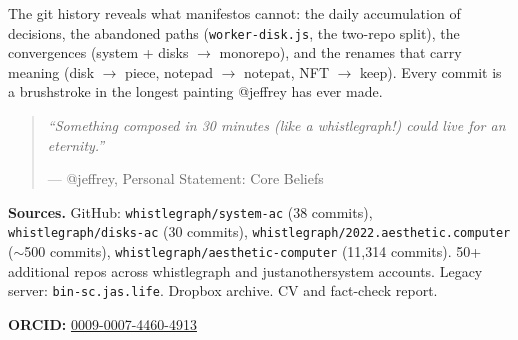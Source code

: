 \documentclass[10pt,letterpaper,twocolumn]{article}
\begin{document}
The git history reveals what manifestos cannot: the daily accumulation of decisions, the abandoned paths (\texttt{worker-disk.js}, the two-repo split), the convergences (system + disks $\rightarrow$ monorepo), and the renames that carry meaning (disk $\rightarrow$ piece, notepad $\rightarrow$ notepat, NFT $\rightarrow$ keep). Every commit is a brushstroke in the longest painting @jeffrey has ever made.

\begin{quote}
\emph{``Something composed in 30 minutes (like a whistlegraph!) could live for an eternity.''}

--- @jeffrey, Personal Statement: Core Beliefs
\end{quote}

\vspace{0.5em}
\noindent\textbf{Sources.} GitHub: \texttt{whistlegraph/system-ac} (38 commits), \texttt{whistlegraph/disks-ac} (30 commits), \texttt{whistlegraph/2022.aesthetic.computer} ($\sim$500 commits), \texttt{whistlegraph/aesthetic-computer} (11,314 commits). 50+ additional repos across whistlegraph and justanothersystem accounts. Legacy server: \texttt{bin-sc.jas.life}. Dropbox archive. CV and fact-check report.

\vspace{0.5em}
\noindent\textbf{ORCID:} \href{https://orcid.org/0009-0007-4460-4913}{0009-0007-4460-4913}




\end{document}
